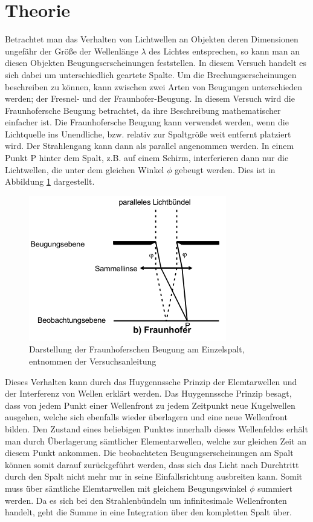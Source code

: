 \section{Theorie}
\label{sec:Theorie}

Betrachtet man das Verhalten von Lichtwellen an Objekten deren Dimensionen ungefähr der Größe der Wellenlänge $\lambda$ des Lichtes entsprechen, so kann man an diesen Objekten Beugungserscheinungen feststellen.
In diesem Versuch handelt es sich dabei um unterschiedlich geartete Spalte.
Um die Brechungserscheinungen beschreiben zu können, kann zwischen zwei Arten von Beugungen unterschieden werden; der Fresnel- und der Fraunhofer-Beugung.
In diesem Versuch wird die Fraunhofersche Beugung betrachtet, da ihre Beschreibung mathematischer einfacher ist.
Die Fraunhofersche Beugung kann verwendet werden, wenn die Lichtquelle ins Unendliche, bzw. relativ zur Spaltgröße weit entfernt platziert wird.
Der Strahlengang kann dann als parallel angenommen werden.
In einem Punkt P hinter dem Spalt, z.B. auf einem Schirm, interferieren dann nur die Lichtwellen, die unter dem gleichen Winkel $\phi$ gebeugt werden.
Dies ist in Abbildung \ref{fig:Fraunhofer} dargestellt.

\begin{figure}
  \centering
  \includegraphics{images/Fraunhofer.png}
  \caption{Darstellung der Fraunhoferschen Beugung am Einzelspalt, entnommen der Versuchsanleitung \cite[31]{1}}
  \label{fig:Fraunhofer}
\end{figure}

Dieses Verhalten kann durch das Huygennssche Prinzip der Elemtarwellen und der Interferenz von Wellen erklärt werden.
Das Huygennssche Prinzip besagt, dass von jedem Punkt einer Wellenfront zu jedem Zeitpunkt neue Kugelwellen ausgehen, welche sich ebenfalls wieder überlagern und eine neue Wellenfront bilden.
Den Zustand eines beliebigen Punktes innerhalb dieses Wellenfeldes erhält man durch Überlagerung sämtlicher Elementarwellen, welche zur gleichen Zeit an diesem Punkt ankommen.
Die beobachteten Beugungserscheinungen am Spalt können somit darauf zurückgeführt werden, dass sich das Licht nach Durchtritt durch den Spalt nicht mehr nur in seine Einfallsrichtung ausbreiten kann.
Somit muss über sämtliche Elemtarwellen mit gleichem Beugungswinkel $\phi$ summiert werden.
Da es sich bei den Strahlenbündeln um infinitesimale Wellenfronten handelt, geht die Summe in eine Integration über den kompletten Spalt über.


